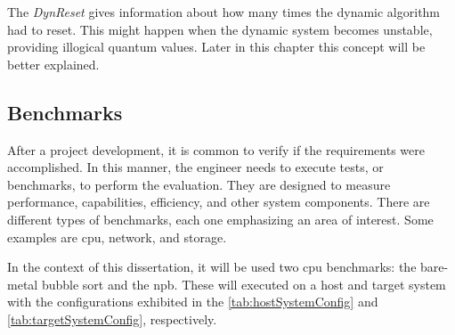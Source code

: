 The \textit{DynReset} gives information about how many times the dynamic algorithm had to reset. This might happen when the dynamic system 
becomes unstable, providing illogical quantum values. Later in this chapter this concept will be better explained. 


\subsection{Benchmarks}
\label{cap:BM}

After a project development, it is common to verify if the requirements were accomplished. In this manner, the engineer 
needs to execute tests, or benchmarks, to perform the evaluation. They are designed to measure performance, capabilities, efficiency, 
and other system components. There are different types of benchmarks, each one emphasizing an area of interest. 
Some examples are \gls{cpu}, network, and storage. 

In the context of this dissertation, it will be used two \gls{cpu} benchmarks: the bare-metal bubble sort and the \gls{npb}. These will 
executed on a host and target system with the configurations exhibited in the \autoref{tab:hostSystemConfig} and \autoref{tab:targetSystemConfig}, 
respectively.
\newline

